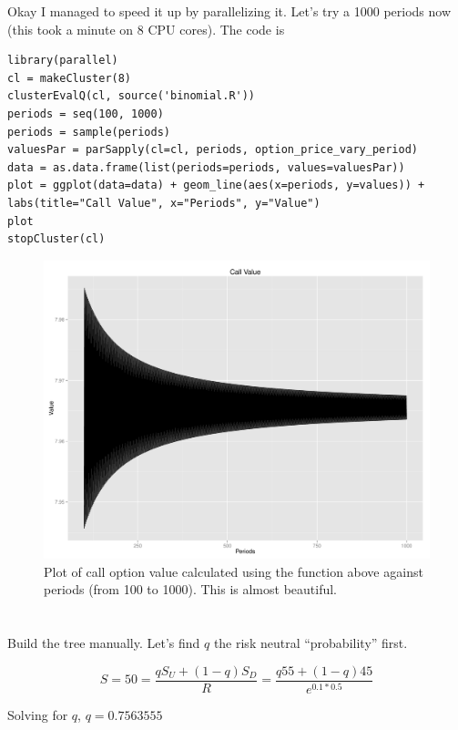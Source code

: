 \documentclass[11pt]{scrartcl}
\begin{document}
Okay I managed to speed it up by parallelizing it. Let's try a 1000 periods now (this took a minute on 8 CPU cores). The code is

\begin{lstlisting}
library(parallel)
cl = makeCluster(8)
clusterEvalQ(cl, source('binomial.R'))
periods = seq(100, 1000)
periods = sample(periods)
valuesPar = parSapply(cl=cl, periods, option_price_vary_period)
data = as.data.frame(list(periods=periods, values=valuesPar))
plot = ggplot(data=data) + geom_line(aes(x=periods, y=values)) + labs(title="Call Value", x="Periods", y="Value")
plot
stopCluster(cl)
\end{lstlisting}

\begin{landscape}
\begin{figure}[H]
\centering\includegraphics[width=1.15\textwidth]{./hw6/problem3-1000.pdf}
\caption{Plot of call option value calculated using the function above against periods (from 100 to 1000). This is almost beautiful.}
\end{figure}
\end{landscape}

\section{}

Build the tree manually. Let's find $q$ the risk neutral ``probability'' first.

\[S = 50 = \frac{qS_U + (1-q)S_D}{R} = \frac{q55 + (1-q)45}{e^{0.1*0.5}}\]

Solving for $q$, $q = 0.7563555$
\end{document}
